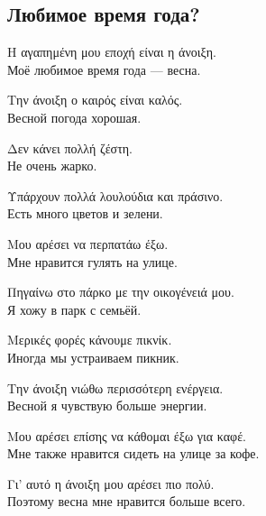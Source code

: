 \documentclass[12pt]{article}
\newcommand{\my}[1]{\textcolor{gray!80!white}{#1}}
\newenvironment{page}{\clearpage\normalsize\null\vfill}{\vfill\null}
\newenvironment{textblock}{\begin{minipage}{\textwidth}}{\end{minipage}\smallskip}
\begin{document}
	\begin{page}
		\subsection{Любимое время года?}
		\small
		\begin{textblock}
			Η αγαπημένη μου εποχή είναι η άνοιξη.\\
			\my{Моё любимое время года — весна.}
			
			Την άνοιξη ο καιρός είναι καλός.\\
			\my{Весной погода хорошая.}
			
			Δεν κάνει πολλή ζέστη.\\
			\my{Не очень жарко.}
			
			Υπάρχουν πολλά λουλούδια και πράσινο.\\
			\my{Есть много цветов и зелени.}
			
			Μου αρέσει να περπατάω έξω.\\
			\my{Мне нравится гулять на улице.}
			
			Πηγαίνω στο πάρκο με την οικογένειά μου.\\
			\my{Я хожу в парк с семьёй.}
			
			Μερικές φορές κάνουμε πικνίκ.\\
			\my{Иногда мы устраиваем пикник.}
			
			Την άνοιξη νιώθω περισσότερη ενέργεια.\\
			\my{Весной я чувствую больше энергии.}
			
			Μου αρέσει επίσης να κάθομαι έξω για καφέ.\\
			\my{Мне также нравится сидеть на улице за кофе.}
			
			Γι’ αυτό η άνοιξη μου αρέσει πιο πολύ.\\
			\my{Поэтому весна мне нравится больше всего.}
		\end{textblock}
	\end{page}
	
\end{document}
